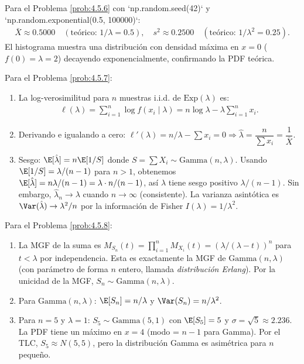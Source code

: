 \begin{solucion}
	\label{sol:4.5.6}
	Para el Problema \ref{prob:4.5.6} con `np.random.seed(42)` y `np.random.exponential(0.5, 100000)`:
	\begin{align*}
		\bar{X} \approx 0.5000 \quad (\text{teórico: } 1/\lambda = 0.5), \quad s^{2} \approx 0.2500 \quad (\text{teórico: } 1/\lambda^{2} = 0.25).
	\end{align*}
	El histograma muestra una distribución con densidad máxima en $x = 0$ ($f(0) = \lambda = 2$) decayendo exponencialmente, confirmando la PDF teórica.
\end{solucion}

\begin{solucion}
	\label{sol:4.5.7}
	Para el Problema \ref{prob:4.5.7}:
	\begin{enumerate}
		\item La log-verosimilitud para $n$ muestras i.i.d. de $\text{Exp}(\lambda)$ es:
		\begin{align*}
			\ell(\lambda) = \sum_{i=1}^{n} \log f(x_i \mid \lambda) = n \log \lambda - \lambda \sum_{i=1}^{n} x_i.
		\end{align*}
		\item Derivando e igualando a cero: $\ell'(\lambda) = n/\lambda - \sum x_i = 0 \Rightarrow \hat{\lambda} = \dfrac{n}{\sum x_i} = \dfrac{1}{\bar{X}}$.
		\item Sesgo: $\E[\hat{\lambda}] = n \E[1/S]$ donde $S = \sum X_i \sim \text{Gamma}(n, \lambda)$. Usando $\E[1/S] = \lambda/(n-1)$ para $n > 1$, obtenemos $\E[\hat{\lambda}] = n\lambda/(n-1) = \lambda \cdot n/(n-1)$, así $\hat{\lambda}$ tiene sesgo positivo $\lambda/(n-1)$. Sin embargo, $\hat{\lambda}_n \to \lambda$ cuando $n \to \infty$ (consistente). La varianza asintótica es $\Var(\hat{\lambda}) \to \lambda^{2}/n$ por la información de Fisher $I(\lambda) = 1/\lambda^{2}$.
	\end{enumerate}
\end{solucion}

\begin{solucion}
	\label{sol:4.5.8}
	Para el Problema \ref{prob:4.5.8}:
	\begin{enumerate}
		\item La MGF de la suma es $M_{S_n}(t) = \prod_{i=1}^{n} M_{X_i}(t) = (\lambda/(\lambda - t))^{n}$ para $t < \lambda$ por independencia. Esta es exactamente la MGF de $\text{Gamma}(n, \lambda)$ (con parámetro de forma $n$ entero, llamada \emph{distribución Erlang}). Por la unicidad de la MGF, $S_n \sim \text{Gamma}(n, \lambda)$.
		\item Para $\text{Gamma}(n, \lambda)$: $\E[S_n] = n/\lambda$ y $\Var(S_n) = n/\lambda^{2}$.
		\item Para $n = 5$ y $\lambda = 1$: $S_5 \sim \text{Gamma}(5, 1)$ con $\E[S_5] = 5$ y $\sigma = \sqrt{5} \approx 2.236$. La PDF tiene un máximo en $x = 4$ (modo = $n - 1$ para Gamma). Por el TLC, $S_5 \approx N(5, 5)$, pero la distribución Gamma es asimétrica para $n$ pequeño.
	\end{enumerate}
\end{solucion}

